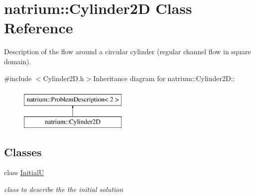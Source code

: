 \hypertarget{classnatrium_1_1Cylinder2D}{
\section{natrium::Cylinder2D Class Reference}
\label{classnatrium_1_1Cylinder2D}
}


Description of the flow around a circular cylinder (regular channel flow in square domain).  


{\ttfamily \#include $<$Cylinder2D.h$>$}Inheritance diagram for natrium::Cylinder2D::\begin{figure}[H]
\begin{center}
\leavevmode
\includegraphics[height=2cm]{classnatrium_1_1Cylinder2D}
\end{center}
\end{figure}
\subsection*{Classes}
\begin{DoxyCompactItemize}
\item 
class \hyperlink{classnatrium_1_1Cylinder2D_1_1InitialU}{InitialU}
\begin{DoxyCompactList}\small\item\em class to describe the the initial solution \item\end{DoxyCompactList}\end{DoxyCompactItemize}

